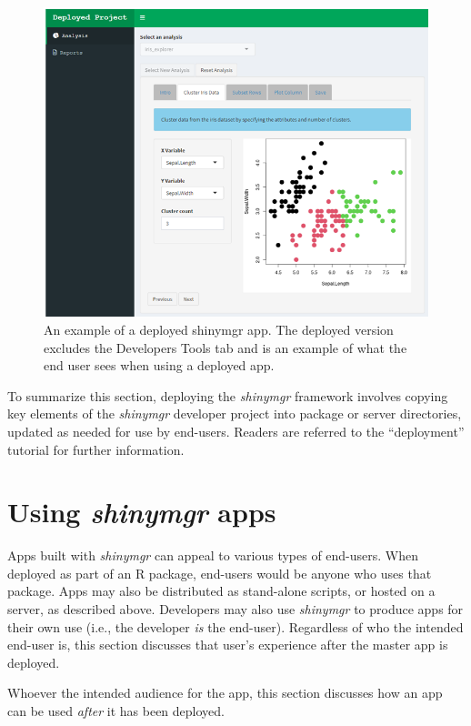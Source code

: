 \begin{figure}
\includegraphics[width=1\linewidth]{images/figure6} \caption{An example of a deployed shinymgr app. The deployed version excludes the Developers Tools tab and is an example of what the end user sees when using a deployed app.}\label{fig:fig6}
\end{figure}

To summarize this section, deploying the \emph{shinymgr} framework involves copying key elements of the \emph{shinymgr} developer project into package or server directories, updated as needed for use by end-users. Readers are referred to the ``deployment'' tutorial for further information.

\section{\texorpdfstring{Using \emph{shinymgr} apps}{Using shinymgr apps}}\label{appUsing}

Apps built with \emph{shinymgr} can appeal to various types of end-users. When deployed as part of an R package, end-users would be anyone who uses that package. Apps may also be distributed as stand-alone scripts, or hosted on a server, as described above. Developers may also use \emph{shinymgr} to produce apps for their own use (i.e., the developer \emph{is} the end-user). Regardless of who the intended end-user is, this section discusses that user's experience after the master app is deployed.

Whoever the intended audience for the app, this section discusses how an app can be used \emph{after} it has been deployed.

